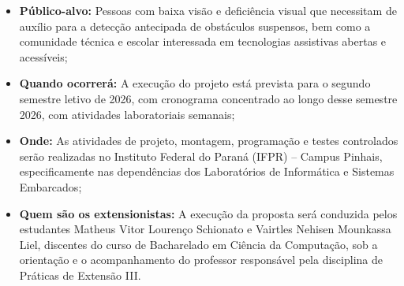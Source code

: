 \begin{itemize}
    \item \textbf{Público-alvo:} Pessoas com baixa visão e deficiência visual que necessitam de auxílio para a detecção antecipada de obstáculos suspensos, bem como a comunidade técnica e escolar interessada em tecnologias assistivas abertas e acessíveis;
    \item \textbf{Quando ocorrerá:} A execução do projeto está prevista para o segundo semestre letivo de 2026, com cronograma concentrado ao longo desse semestre 2026, com atividades laboratoriais semanais;
    \item \textbf{Onde:} As atividades de projeto, montagem, programação e testes controlados serão realizadas no Instituto Federal do Paraná (IFPR) -- Campus Pinhais, especificamente nas dependências dos Laboratórios de Informática e Sistemas Embarcados;
    \item \textbf{Quem são os extensionistas:} A execução da proposta será conduzida pelos estudantes Matheus Vitor Lourenço Schionato e Vairtles Nehisen Mounkassa Liel, discentes do curso de Bacharelado em Ciência da Computação, sob a orientação e o acompanhamento do professor responsável pela disciplina de Práticas de Extensão III.
\end{itemize}
